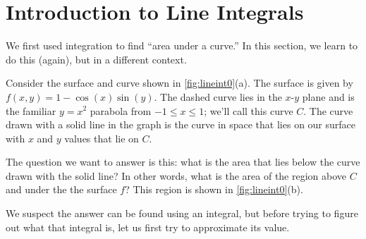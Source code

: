 \section{Introduction to Line Integrals}\label{sec:line_int_intro}


We first used integration to find ``area under a curve.'' In this section, we learn to do this (again), but in a different context.

Consider the surface and curve shown in \autoref{fig:lineint0}(a). The surface is given by $f(x,y)=1-\cos(x)\sin(y)$. The dashed curve lies in the $x$-$y$ plane and is the familiar $y=x^2$ parabola from $-1\leq x\leq1$; we'll call this curve $C$. The curve drawn with a solid line in the graph is the curve in space that lies on our surface with $x$ and $y$ values that lie on $C$. 

The question we want to answer is this: what is the area that lies below the curve drawn with the solid line? In other words, what is the area of the region above $C$ and under the the surface $f$? This region is shown in \autoref{fig:lineint0}(b).

We suspect the answer can be found using an integral, but before trying to figure out what that integral is, let us first try to approximate its value. 

